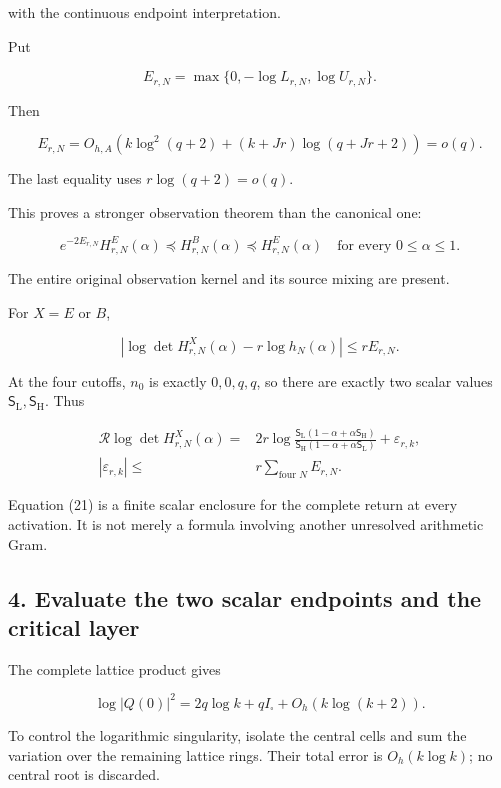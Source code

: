 \documentclass[11pt]{article}
\begin{document}
with the continuous endpoint interpretation.

Put

\[
E_{r,N}
=
\max\{0,-\log L_{r,N},\log U_{r,N}\}.
\]

Then

\[
\boxed{
E_{r,N}
=
O_{h,A}\!\left(
k\log^2(q+2)+(k+Jr)\log(q+Jr+2)
\right)=o(q).
}
\tag{18}
\]

The last equality uses \(r\log(q+2)=o(q)\).

This proves a stronger observation theorem than the canonical one:

\[
\boxed{
e^{-2E_{r,N}}H^E_{r,N}(\alpha)
\preceq H^B_{r,N}(\alpha)
\preceq H^E_{r,N}(\alpha)
\quad\text{for every }0\le\alpha\le1.
}
\tag{19}
\]

The entire original observation kernel and its source mixing are present.

For \(X=E\) or \(B\),

\[
\left|
\log\det H^X_{r,N}(\alpha)-r\log h_N(\alpha)
\right|
\le rE_{r,N}.
\tag{20}
\]

At the four cutoffs, \(n_0\) is exactly \(0,0,q,q\), so there are exactly two scalar values \(\mathsf S_{\mathrm L},\mathsf S_{\mathrm H}\). Thus

\[
\boxed{
\begin{aligned}
\mathcal R\log\det H^X_{r,N}(\alpha)
={}&
2r\log
\frac{
\mathsf S_{\mathrm L}(1-\alpha+\alpha\mathsf S_{\mathrm H})
}{
\mathsf S_{\mathrm H}(1-\alpha+\alpha\mathsf S_{\mathrm L})
}
+\varepsilon_{r,k},\\
|\varepsilon_{r,k}|
\le{}&r\sum_{\text{four }N}E_{r,N}.
\end{aligned}}
\tag{21}
\]

Equation (21) is a finite scalar enclosure for the complete return at every activation. It is not merely a formula involving another unresolved arithmetic Gram.

\subsection{4. Evaluate the two scalar endpoints and the critical layer}\label{evaluate-the-two-scalar-endpoints-and-the-critical-layer}

The complete lattice product gives

\[
\log|Q(0)|^2
=
2q\log k+qI_\square+O_h(k\log(k+2)).
\tag{22}
\]

To control the logarithmic singularity, isolate the central cells and sum the variation over the remaining lattice rings. Their total error is \(O_h(k\log k)\); no central root is discarded.
\end{document}
